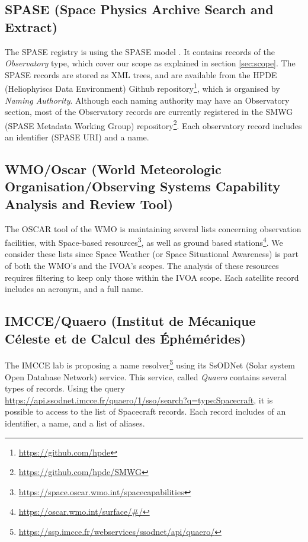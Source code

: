 \documentclass[11pt,a4paper]{ivoa}
\begin{document}
\subsection{SPASE (Space Physics Archive Search and Extract)}
The SPASE registry is using the SPASE model \citep{Roberts:2018bi}.
It contains records of the \emph{Observatory} type, which cover our
scope as explained in section \ref{sec:scope}. The SPASE records
are stored as XML trees, and are available from the HPDE (Heliophyiscs
Data Environment) Github repository\footnote{\url{https://github.com/hpde}},
which is organised by \emph{Naming Authority}. Although each naming
authority may have an Observatory section, most of the Observatory
records are currently registered in the SMWG (SPASE Metadata Working
Group) repository\footnote{\url{https://github.com/hpde/SMWG}}.
Each observatory record includes an identifier (SPASE URI) and a name.

\subsection{WMO/Oscar (World Meteorologic Organisation/Observing Systems Capability Analysis and Review Tool)}
The OSCAR tool of the WMO is maintaining several lists concerning
observation facilities, with Space-based resources\footnote{\url{https://space.oscar.wmo.int/spacecapabilities}},
as well as ground based stations\footnote{\url{https://oscar.wmo.int/surface/\#/}}.
We consider these lists since Space Weather (or Space Situational
Awareness) is part of both the WMO's and the IVOA's scopes. The analysis of these
resources requires filtering to keep only those within the IVOA scope.
Each satellite record includes an acronym, and a full name.

\subsection{IMCCE/Quaero (Institut de M\'ecanique C\'eleste et de Calcul des \'Eph\'em\'erides)}
The IMCCE lab is proposing a name resolver\footnote{\url{https://ssp.imcce.fr/webservices/ssodnet/api/quaero/}}
using its SsODNet (Solar system Open Database Network) service. This
service, called \emph{Quaero} contains several types of records. Using
the query \url{https://api.ssodnet.imcce.fr/quaero/1/sso/search?q=type:Spacecraft},
it is possible to access to the list of Spacecraft records. Each
record includes of an identifier, a name, and a list of
aliases.
\end{document}
